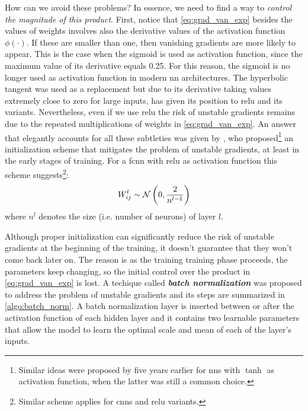 How can we avoid these problems? In essence, we need to find a way to
\emph{control the magnitude of this product}. First, notice that \Equation{}
\ref{eq:grad_van_exp} besides the values of weights involves also the derivative
values of the activation function $\phi(\cdot)$. If these are smaller than one, then
vanishing gradients are more likely to appear. This is the case when the
sigmoid is used as activation function, since the maximum value
of its derivative equals \num{0.25}. For this reason, the sigmoid is no longer
used as activation function in modern \gls{nn} architectures. The hyperbolic
tangent was used as a replacement but due to its
derivative taking values extremely close to zero for large inputs, has given its
position to \gls{relu} and its variants. Nevertheless, even if we use \gls{relu}
the risk of unstable gradients remains due to the repeated multiplications of
weights in \Equation{} \ref{eq:grad_van_exp}. An answer that
elegantly accounts for all these subtleties was given by \cite{He2015}, who
proposed\footnote{Similar ideas were proposed by \cite{Glorot2010} five years
earlier for \glspl{nn} with $\tanh$ as activation function, when the latter was
still a common choice.} an initialization scheme that mitigates the problem of
unstable gradients, at least in the early stages of
training. For a \gls{fcnn} with \gls{relu} as activation function this scheme
suggests\footnote{Similar scheme applies for \glspl{cnn} and \gls{relu}
variants.}:
\begin{equation}
	\label{eq:he_initialization}
	W_{ij}^l \sim \mathcal{N}\left(0, \frac{2}{n^{l-1}}\right)
\end{equation}
where $n^{l}$ denotes the size (i.e. number of neurons) of layer $l$.

Although proper initialization can significantly reduce the risk of unstable
gradients at the beginning of the training, it doesn't guarantee that they won't
come back later on. The reason is as the training training phase proceeds,
the parameters keep changing, so the initial control over the product in
\Equation{} \ref{eq:grad_van_exp} is lost. A techique called \emph{\textbf{batch
normalization}} \parencite{Ioffe2015} was proposed to
address the problem of unstable gradients and its steps are summarized in
\Algorithm{} \ref{algo:batch_norm}. A batch normalization layer is inserted between or after the activation function of
each hidden layer and it contains two learnable parameters that allow the model
to learn the optimal scale and mean of each of the layer's inputs.


